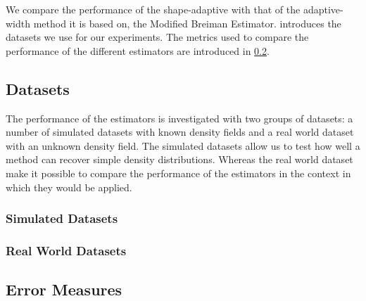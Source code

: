 We compare the performance of the shape-adaptive with that of the adaptive-width method it is based on, \ie the Modified Breiman Estimator.  introduces the datasets we use for our experiments. The metrics used to compare the performance of the different estimators are introduced in \cref{ss:3:errorMeasures}.

\subsection{Datasets}
\label{ss:3:datasets}
	The performance of the estimators is investigated with two groups of datasets: a number of simulated datasets with known density fields and a real world dataset with an unknown density field. The simulated datasets allow us to test how well a method can recover simple density distributions. Whereas the real world dataset make it possible to compare the performance of the estimators in the context in which they would be applied. 

	\subsubsection*{Simulated Datasets}
					

	\subsubsection*{Real World Datasets}

\subsection{Error Measures}
\label{ss:3:errorMeasures}

